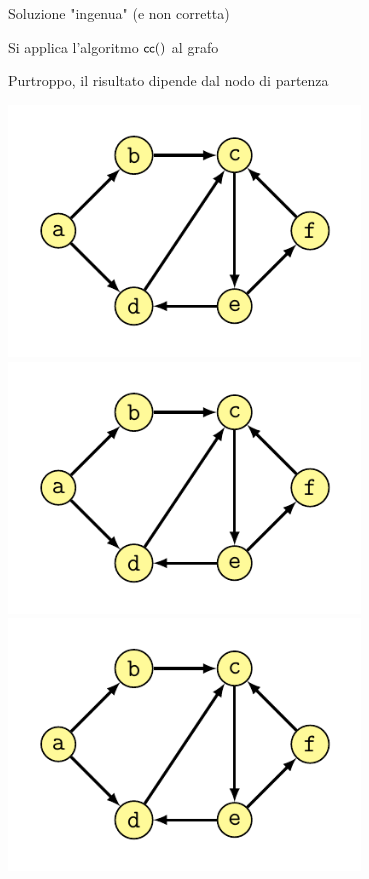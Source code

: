 \begin{frame}{Soluzione "ingenua" (e non corretta)}

\BIL
\item Si applica l'algoritmo $\textsf{{\small cc}}()$ al grafo 
\item Purtroppo, il risultato dipende dal nodo di partenza
\EIL

\begin{overprint}
\centering\includegraphics[width=0.70\textwidth,page=3]{scc.pdf}
\centering\includegraphics[width=0.70\textwidth,page=4]{scc.pdf}
\centering\includegraphics[width=0.70\textwidth,page=5]{scc.pdf}
\end{overprint}

\end{frame}


